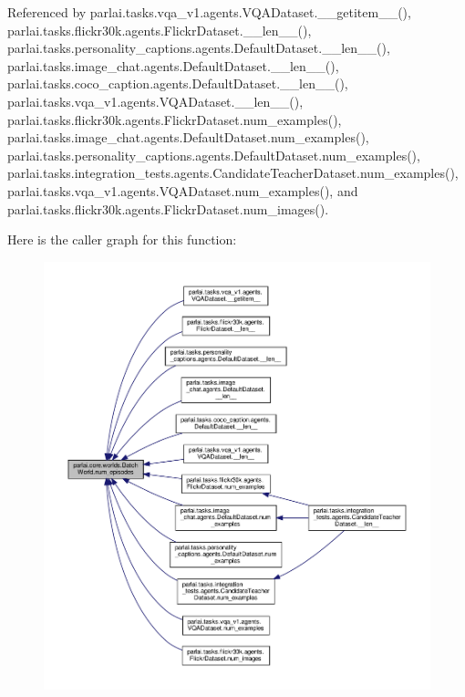 Referenced by parlai.\+tasks.\+vqa\+\_\+v1.\+agents.\+V\+Q\+A\+Dataset.\+\_\+\+\_\+getitem\+\_\+\+\_\+(), parlai.\+tasks.\+flickr30k.\+agents.\+Flickr\+Dataset.\+\_\+\+\_\+len\+\_\+\+\_\+(), parlai.\+tasks.\+personality\+\_\+captions.\+agents.\+Default\+Dataset.\+\_\+\+\_\+len\+\_\+\+\_\+(), parlai.\+tasks.\+image\+\_\+chat.\+agents.\+Default\+Dataset.\+\_\+\+\_\+len\+\_\+\+\_\+(), parlai.\+tasks.\+coco\+\_\+caption.\+agents.\+Default\+Dataset.\+\_\+\+\_\+len\+\_\+\+\_\+(), parlai.\+tasks.\+vqa\+\_\+v1.\+agents.\+V\+Q\+A\+Dataset.\+\_\+\+\_\+len\+\_\+\+\_\+(), parlai.\+tasks.\+flickr30k.\+agents.\+Flickr\+Dataset.\+num\+\_\+examples(), parlai.\+tasks.\+image\+\_\+chat.\+agents.\+Default\+Dataset.\+num\+\_\+examples(), parlai.\+tasks.\+personality\+\_\+captions.\+agents.\+Default\+Dataset.\+num\+\_\+examples(), parlai.\+tasks.\+integration\+\_\+tests.\+agents.\+Candidate\+Teacher\+Dataset.\+num\+\_\+examples(), parlai.\+tasks.\+vqa\+\_\+v1.\+agents.\+V\+Q\+A\+Dataset.\+num\+\_\+examples(), and parlai.\+tasks.\+flickr30k.\+agents.\+Flickr\+Dataset.\+num\+\_\+images().

Here is the caller graph for this function\+:
\nopagebreak
\begin{figure}[H]
\begin{center}
\leavevmode
\includegraphics[width=350pt]{classparlai_1_1core_1_1worlds_1_1BatchWorld_ae3f96cd2de72eb0f333cb29bbf74177b_icgraph}
\end{center}
\end{figure}
\mbox{\label{classparlai_1_1core_1_1worlds_1_1BatchWorld_a047736ed3867bf7631af02f8eb0528d8}} 
